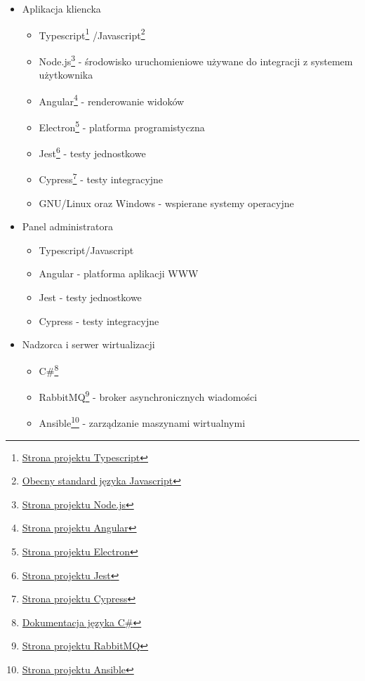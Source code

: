 \documentclass[../deliverable-two.tex]{subfiles}
\begin{document}
\begin{itemize}
    \item Aplikacja kliencka
          \begin{itemize}
              \item Typescript\footnote{\href{https://www.typescriptlang.org}{Strona projektu Typescript}}
                    /Javascript\footnote{\href{https://www.ecma-international.org/publications-and-standards/standards/ecma-262}{Obecny standard języka Javascript}}
              \item Node.js\footnote{\href{https://nodejs.org/en}{Strona projektu Node.js}} - środowisko uruchomieniowe używane do integracji z systemem użytkownika
              \item Angular\footnote{\href{https://angular.io/}{Strona projektu Angular}} - renderowanie widoków
              \item Electron\footnote{\href{https://www.electronjs.org/}{Strona projektu Electron}} - platforma programistyczna
              \item Jest\footnote{\href{https://jestjs.io/}{Strona projektu Jest}} - testy jednostkowe
              \item Cypress\footnote{\href{https://www.cypress.io/}{Strona projektu Cypress}} - testy integracyjne
              \item GNU/Linux oraz Windows - wspierane systemy operacyjne
          \end{itemize}
    \item Panel administratora
          \begin{itemize}
              \item Typescript/Javascript
              \item Angular - platforma aplikacji WWW
              \item Jest - testy jednostkowe
              \item Cypress - testy integracyjne
          \end{itemize}
    \item Nadzorca i serwer wirtualizacji
          \begin{itemize}
              \item C\#\footnote{\href{https://docs.microsoft.com/en-us/dotnet/csharp/}{Dokumentacja języka C\#}}
              \item RabbitMQ\footnote{\href{https://www.rabbitmq.com/}{Strona projektu RabbitMQ}} - broker asynchronicznych wiadomości
              \item Ansible\footnote{\href{https://www.ansible.com/}{Strona projektu Ansible}} - zarządzanie maszynami wirtualnymi

\end{itemize}
\end{itemize}
\end{document}

